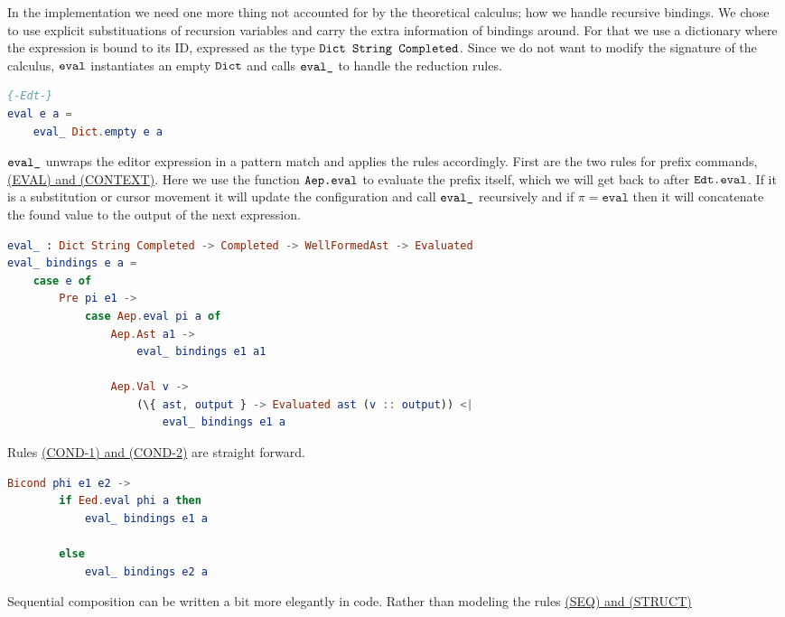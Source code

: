 In the implementation we need one more thing not accounted for by the
theoretical calculus; how we handle recursive bindings. We chose to use
explicit substituations of recursion variables and carry the extra information
of bindings around. For that we use a dictionary where the expression is bound
to its ID, expressed as the type $\texttt{Dict String Completed}$. Since we do not
want to modify the signature of the calculus, $\texttt{eval}$ instantiates an
empty $\texttt{Dict}$ and calls $\texttt{eval\_}$ to handle the reduction rules.
\begin{lstlisting}[language=elm,%
                   label="edt-eval",%
                   gobble=0,%
                   ]
{-Edt-}
eval e a =
    eval_ Dict.empty e a
\end{lstlisting}
$\texttt{eval\_}$ unwraps the editor expression in a pattern match and applies the
rules accordingly. First are the two rules for prefix commands,
\hyperref[fig:edtreductionrules]{(EVAL) and (CONTEXT)}. Here we use the
function $\texttt{Aep.eval}$ to evaluate the prefix itself, which we will get back
to after $\texttt{Edt.eval}$. If it is a substitution or cursor movement it will
update the configuration and call $\texttt{eval\_}$ recursively and if $\pi =
\texttt{eval}$ then it will concatenate the found value to the output of the
next expression.
\begin{lstlisting}[language=elm,%
                   label="edt-eval_-pre",%
                   gobble=0,%
                   ]
eval_ : Dict String Completed -> Completed -> WellFormedAst -> Evaluated
eval_ bindings e a =
    case e of
        Pre pi e1 ->
            case Aep.eval pi a of
                Aep.Ast a1 ->
                    eval_ bindings e1 a1

                Aep.Val v ->
                    (\{ ast, output } -> Evaluated ast (v :: output)) <|
                        eval_ bindings e1 a
\end{lstlisting}
Rules \hyperref[fig:edtreductionrules]{(COND-1) and (COND-2)} are straight forward.
\begin{lstlisting}[language=elm,%
                   label="edt-eval_-bicond",%
                   gobble=4,%
                   ]
    Bicond phi e1 e2 ->
        if Eed.eval phi a then
            eval_ bindings e1 a

        else
            eval_ bindings e2 a
\end{lstlisting}
Sequential composition can be written a bit more elegantly in code. Rather than
modeling the rules \hyperref[fig:edtreductionrules]{(SEQ) and (STRUCT)}
